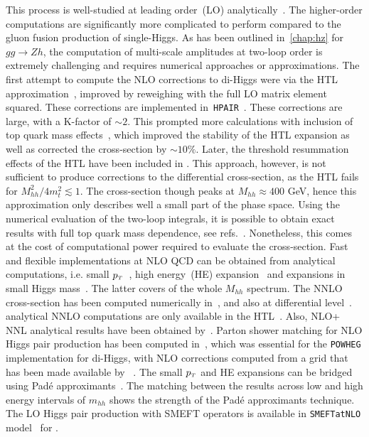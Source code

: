 This process is well-studied at leading order~(LO) analytically~\cite{EBOLI1987269, GLOVER1988282, DICUS1988457, Plehn:1996wb}.  The higher-order computations are significantly more complicated to perform compared to the gluon fusion production of single-Higgs. As has been outlined in~\autoref{chap:hz} for $gg \to Zh$, the computation of multi-scale amplitudes at two-loop order is extremely challenging and requires numerical approaches or approximations. The first attempt to compute the NLO corrections to di-Higgs were via the HTL approximation~\cite{Dawson:1998py, Altenkamp:2012sx,Grigo:2014jma}, improved by reweighing with the full LO matrix element squared. These corrections are implemented in~\texttt{HPAIR}~\cite{Plehn:1996wb}. These corrections are large, with a K-factor of $ \sim 2$.  This prompted more calculations with inclusion of top quark mass effects~\cite{deFlorian:2013uza,Maltoni:2014eza,Grigo:2015dia,Degrassi:2016vss}, which improved the stability of the HTL expansion as well as corrected the cross-section by $\sim 10\%$. Later, the threshold resummation effects of the HTL have been included in \cite{Shao:2013bz}. This approach, however, is not sufficient to produce corrections to the differential cross-section, as the HTL fails for $M_{hh}^2/4m_t^2 \lesssim 1$. The cross-section though peaks at $ M_{hh}\approx 400$ GeV, hence this approximation only describes well a small part of the phase space. Using the numerical evaluation of the two-loop integrals, it is possible to obtain exact results with full top quark mass dependence, see refs.~\cite{Borowka:2016ypz,Borowka:2016ehy,Baglio:2018lrj}. Nonetheless, this comes at the cost of computational power required to evaluate the cross-section. Fast and flexible implementations at NLO QCD can be obtained from analytical computations, i.e. small $p_{\scriptscriptstyle T}$~\cite{Bonciani:2018omm}, high energy~(HE) expansion~\cite{Davies:2018ood} and expansions in small Higgs mass~\cite{Xu:2018eos,Wang:2020nnr}. The latter covers of the whole $M_{hh}$ spectrum. The NNLO cross-section has been computed numerically in~\cite{Grazzini:2018bsd}, and also at differential level~\cite{deFlorian:2016uhr}. analytical NNLO computations are only available in the HTL~\cite{deFlorian:2013jea}. Also, NLO+ NNL analytical results have been obtained by~\cite{deFlorian:2015moa}. Parton shower matching for NLO Higgs pair production has been computed  in~\cite{Jones:2017giv}, which was essential for the \texttt{POWHEG} implementation for di-Higgs, with NLO corrections computed from a grid that has been made available by ~\cite{Heinrich:2017kxx,Heinrich:2019bkc,Heinrich:2020ckp}.  The small $p_{\scriptscriptstyle T}$ and HE expansions can be bridged using Pad\'e  approximants~\cite{Bellafronte:2022jmo}.  The matching between the results across low and high energy intervals of $m_{hh}$ shows the strength of the Pad\'e  approximants technique. 
%
The LO Higgs pair production with SMEFT operators is available in \texttt{SMEFTatNLO} model~\cite{Degrande:2020evl} for \Madgraph.

